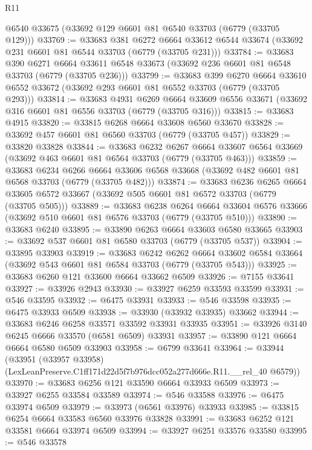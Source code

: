 \begin{lexlean}{R11}
\begin{coremodule}
    @6540
    @33675
    (@33692 @129 @6601 @81 @6540 @33703 (@6779 (@33705 @129)))
@33769 := @33683
    @381
    @6272
    @6664
    @33612
    @6544
    @33674
    (@33692 @231 @6601 @81 @6544 @33703 (@6779 (@33705 @231)))
@33784 := @33683
    @390
    @6271
    @6664
    @33611
    @6548
    @33673
    (@33692 @236 @6601 @81 @6548 @33703 (@6779 (@33705 @236)))
@33799 := @33683
    @399
    @6270
    @6664
    @33610
    @6552
    @33672
    (@33692 @293 @6601 @81 @6552 @33703 (@6779 (@33705 @293)))
@33814 := @33683
    @4931
    @6269
    @6664
    @33609
    @6556
    @33671
    (@33692 @316 @6601 @81 @6556 @33703 (@6779 (@33705 @316)))
@33815 := @33683 @4915
@33820 := @33815 @6268 @6664 @33608 @6560 @33670
@33828 := @33692 @457 @6601 @81 @6560 @33703 (@6779 (@33705 @457))
@33829 := @33820 @33828
@33844 := @33683
    @6232
    @6267
    @6664
    @33607
    @6564
    @33669
    (@33692 @463 @6601 @81 @6564 @33703 (@6779 (@33705 @463)))
@33859 := @33683
    @6234
    @6266
    @6664
    @33606
    @6568
    @33668
    (@33692 @482 @6601 @81 @6568 @33703 (@6779 (@33705 @482)))
@33874 := @33683
    @6236
    @6265
    @6664
    @33605
    @6572
    @33667
    (@33692 @505 @6601 @81 @6572 @33703 (@6779 (@33705 @505)))
@33889 := @33683
    @6238
    @6264
    @6664
    @33604
    @6576
    @33666
    (@33692 @510 @6601 @81 @6576 @33703 (@6779 (@33705 @510)))
@33890 := @33683 @6240
@33895 := @33890 @6263 @6664 @33603 @6580 @33665
@33903 := @33692 @537 @6601 @81 @6580 @33703 (@6779 (@33705 @537))
@33904 := @33895 @33903
@33919 := @33683
    @6242
    @6262
    @6664
    @33602
    @6584
    @33664
    (@33692 @543 @6601 @81 @6584 @33703 (@6779 (@33705 @543)))
@33925 := @33683 @6260 @121 @33600 @6664 @33662 @6509
@33926 := @7155 @33641
@33927 := @33926 @2943
@33930 := @33927 @6259 @33593 @33599
@33931 := @546 @33595
@33932 := @6475 @33931
@33933 := @546 @33598
@33935 := @6475 @33933 @6509
@33938 := @33930 (@33932 @33935) @33662
@33944 := @33683 @6246 @6258 @33571 @33592 @33931 @33935
@33951 := @33926 @3140 @6245 @6666 @33570 (@6581 @6509) @33931
@33957 := @33890 @121 @6664 @6664 @6580 @6509 @33903
@33958 := @6799 @33641
@33964 := @33944
    (@33951 (@33957 @33958) (LexLeanPreserve.C1ff171d22d5f7b976dcc052a277d666e.R11.__rel_40 @6579))
@33970 := @33683 @6256 @121 @33590 @6664 @33933 @6509
@33973 := @33927 @6255 @33584 @33589
@33974 := @546 @33588
@33976 := @6475 @33974 @6509
@33979 := @33973 (@6561 @33976) @33933
@33985 := @33815 @6254 @6664 @33583 @6560 @33976 @33828
@33991 := @33683 @6252 @121 @33581 @6664 @33974 @6509
@33994 := @33927 @6251 @33576 @33580
@33995 := @546 @33578

\end{coremodule}
\end{lexlean}
